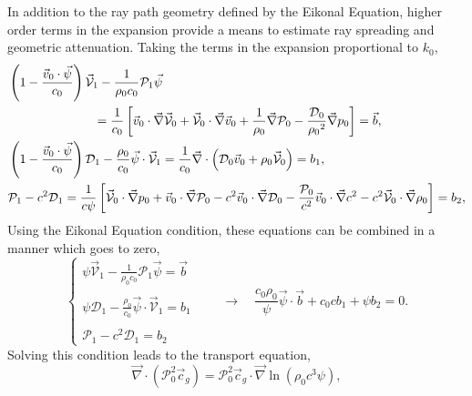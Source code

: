 \documentclass[10pt]{article}
\begin{document}
In addition to the ray path geometry defined by the Eikonal Equation, higher order terms in the expansion provide a means to estimate ray spreading and geometric attenuation.  Taking the terms in the expansion proportional to \(k_0\),
\begin{subequations}
 \label{Eq:TransportEqs}
\begin{align}
& \left( 1 - \frac{\vec{v}_0 \cdot \vec{\psi}}{c_0} \right) \vec{\mathcal{V}}_1 - \frac{1}{\rho_0 c_0} \mathcal{P}_1 \vec{\psi} \nonumber \\
 \label{Eq:TransportEqs:Continuity}
& \hspace{0.2\textwidth} =  \frac{1}{c_0} \left[ \vec{v}_0 \cdot\vec{\nabla}\vec{\mathcal{V}}_0 + \vec{\mathcal{V}}_0 \cdot\vec{\nabla}\vec{v}_0 + \frac{1}{\rho_0} \vec{\nabla} \mathcal{P}_0 - \frac{\mathcal{D}_0}{\rho_0{}^2}\vec{\nabla}p_0 \right] = \vec{b}, \\
 \label{Eq:TransportEqs:Euler}
&\left( 1 - \frac{\vec{v}_0 \cdot \vec{\psi}}{c_0} \right) \mathcal{D}_1 - \frac{\rho_0}{c_0} \vec{\psi} \cdot \vec{\mathcal{V}}_1 = \frac{1}{c_0}\vec{\nabla}\cdot \left( \mathcal{D}_0 \vec{v}_0 + \rho_0 \vec{\mathcal{V}}_0 \right) = b_1, \\
 \label{Eq:TransportEqs:State}
&\mathcal{P}_1 - c^2 \mathcal{D}_1 = \frac{1}{c \psi} \left[ \vec{\mathcal{V}}_0 \cdot\vec{\nabla} p_0 + \vec{v}_0 \cdot\vec{\nabla}\mathcal{P}_0 - c^2 \vec{v}_0 \cdot\vec{\nabla} \mathcal{D}_0 - \frac{\mathcal{P}_0}{c^2} \vec{v}_0 \cdot \vec{\nabla} c^2 - c^2 \vec{\mathcal{V}}_0 \cdot\vec{\nabla}\rho_0 \right] = b_2,
\end{align}
\end{subequations}
Using the Eikonal Equation condition, these equations can be combined in a manner which goes to zero,
\begin{equation}
\left\{
\begin{matrix}
\psi \vec{\mathcal{V}}_1 - \frac{1}{\rho_0 c_0} \mathcal{P}_1 \vec{\psi} = \vec{b} \\ \\
\psi \mathcal{D}_1 - \frac{\rho_0}{c_0} \vec{\psi} \cdot \vec{\mathcal{V}}_1 = b_1 \\ \\
\mathcal{P}_1 - c^2 \mathcal{D}_1 = b_2
\end{matrix}
\right. \quad \quad \rightarrow \quad
\frac{c_0 \rho_0}{\psi} \vec{\psi} \cdot \vec{b} + c_0 c b_1 + \psi b_2 = 0.
\end{equation}
Solving this condition leads to the transport equation,
\begin{equation}
 \label{Eq:TransportEq}
\vec{\nabla} \cdot \left( \mathcal{P}_0^2 \vec{c}_g \right) = \mathcal{P}_0^2 \vec{c}_g \cdot \vec{\nabla} \ln \left( \rho_0 c^3 \psi \right),
\end{equation}
\end{document}
